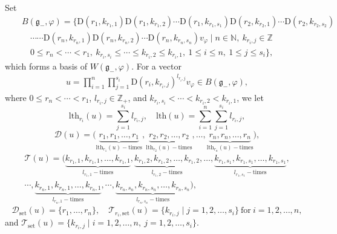 \documentclass[12pt, a4paper]{amsart}
\newcommand{\fg}{\mathfrak g}
\newcommand{\N}{\mathbb N}
\newcommand{\Z}{\mathbb Z}
\newcommand{\rD}{\mathrm{D}}
\theoremstyle{Theorem}
\theoremstyle{Theorem}
\numberwithin{equation}{section}
\begin{document}
Set\begin{eqnarray*}&&B(\fg_{-},\varphi)=\{\rD(r_{1},k_{r_{1},1})\rD(r_{1},k_{r_{1},2})\cdots
\rD(r_{1},k_{r_{1},s_{1}})\rD(r_{2},k_{r_{2},1})\cdots
\rD(r_{2},k_{r_{2},s_{2}})\\&&
\quad\cdots\cdots\rD(r_{n},k_{r_{n},1})\rD(r_{n},k_{r_{n},2})\cdots
\rD(r_{n},k_{r_{n},s_{n}})v_{\varphi}\mid n\in\N,\ k_{r_{i},j}\in\Z\\&&\quad
0\leq r_{n}<\cdots<r_{1},\ k_{r_{i},s_{i}}\leq\cdots\leq k_{r_{i},2}\leq k_{r_{i},1},\
1\leq i\leq n,\ 1\leq j\leq s_{i}\},\end{eqnarray*}
which forms a basis of $W(\fg_{-},\varphi)$.
For a vector \begin{eqnarray}\label{Topical-vector--}u=\prod_{i=1}^{n}\prod_{j=1}^{s_{i}}
\rD(r_{i},k_{r_{i},j})^{l_{r_{i},j}}v_{\varphi}\in B(\fg_{-},\varphi),\end{eqnarray}
where $0\leq r_{n}<\cdots<r_{1}$, $l_{r_{i},j}\in\Z_{+}$, and $k_{r_{i},s_{i}}<\cdots<k_{r_{i},2}<k_{r_{i},1}$,
we let \[\mathrm{lth}_{r_{i}}(u)=\sum_{j=1}^{s_{i}}l_{r_{i},j},\quad
\mathrm{lth}(u)=\sum_{i=1}^{n}\sum_{j=1}^{s_{i}}l_{r_{i},j},\]
\[\mathcal{D}(u)=\big(\underbrace{r_{1},r_{1},\dots,r_{1}}_{\mathrm{lth}_{r_{1}}(u)-\mathrm{times}},
\underbrace{r_{2},r_{2},\dots,r_{2}}_{\mathrm{lth}_{r_{2}}(u)-\mathrm{times}},\dots,
\underbrace{r_{n},r_{n},\dots,r_{n}}_{\mathrm{lth}_{r_{n}}(u)-\mathrm{times}}\big),\]
$$\begin{aligned}\mathcal{T}(u)=\big(\underbrace{k_{r_{1},1},k_{r_{1},1},\dots,k_{r_{1},1}}_{l_{r_{1},1}-\mathrm{times}},
\underbrace{k_{r_{1},2},k_{r_{1},2},\dots,k_{r_{1},2}}_{l_{r_{1},2}-\mathrm{times}},\dots,
\underbrace{k_{r_{1},s_{1}},k_{r_{1},s_{1}},\dots,k_{r_{1},s_{1}}}_{l_{r_{1},s_{1}}-\mathrm{times}},\\ \cdots,
\underbrace{k_{r_{n},1},k_{r_{n},1},\dots,k_{r_{n},1}}_{l_{r_{n},1}-\mathrm{times}},\cdots,
\underbrace{k_{r_{n},s_{n}},k_{r_{n},s_{n}},\dots,k_{r_{n},s_{n}}}_{l_{r_{n},s_{n}}-\mathrm{times}}\big),\end{aligned}$$
\[\mathcal{D}_{\mathrm{set}}(u)=\{r_{1},\dots,r_{n}\},\quad\mathcal{T}_{r_{i},
\mathrm{set}}(u)=\{k_{r_{i},j}\mid j=1,2,\dots,s_{i}\}\ \text{for}\ i=1,2,\dots,n,\]and
$\mathcal{T}_{\mathrm{set}}(u)=\{k_{r_{i},j}\mid i=1,2,\dots,n,\ j=1,2,\dots,s_{i}\}$.
\end{document}
